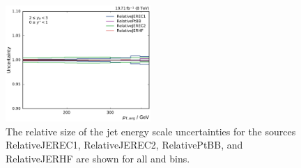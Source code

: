 \begin{figure}[htbp]
    \includegraphics[width=0.49\textwidth]{figures/measurement/jec_relunc_2_yb2ys0.pdf}
    \caption[Split-up of JEC uncertainty sources: Part III] {The relative size of the jet energy scale
             uncertainties for the sources RelativeJEREC1, RelativeJEREC2,
             RelativePtBB, and RelativeJERHF are shown for all \ystar and \yboost bins.}
    \label{fig:jec_relunc_2}
\end{figure}


